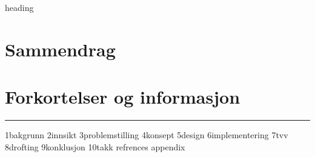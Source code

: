\documentclass[a4paper,11pt,norsk]{article}
\begin{document}
{heading}
\section*{Sammendrag}
\section*{Forkortelser og informasjon}
\rule{\textwidth}{1pt}
{1bakgrunn}
{2innsikt}
{3problemstilling}
{4konsept}
{5design}    
{6implementering}
{7tvv}
{8drofting}
{9konklusjon}
{10takk}
{refrences}
{appendix}
\end{document}
